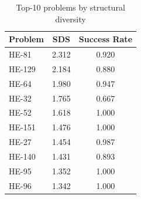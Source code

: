 \begin{table}[t]
\centering
\caption{Top-10 problems by structural diversity}
\label{tab:top_structural_diversity}
\begin{tabular}{lcc}
\toprule
Problem & SDS & Success Rate \\
\midrule
HE-81 & 2.312 & 0.920 \\
HE-129 & 2.184 & 0.880 \\
HE-64 & 1.980 & 0.947 \\
HE-32 & 1.765 & 0.667 \\
HE-52 & 1.618 & 1.000 \\
HE-151 & 1.476 & 1.000 \\
HE-27 & 1.454 & 0.987 \\
HE-140 & 1.431 & 0.893 \\
HE-95 & 1.352 & 1.000 \\
HE-96 & 1.342 & 1.000 \\
\bottomrule
\end{tabular}
\end{table}
